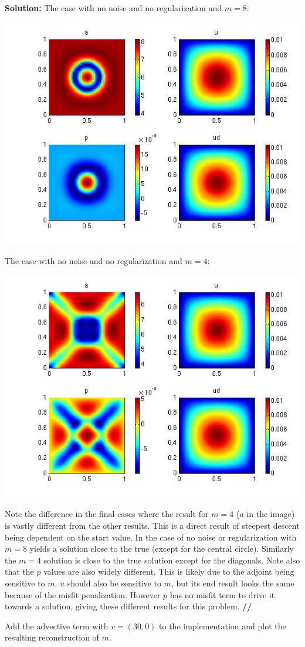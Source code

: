 \documentclass[11pt]{article}
\newenvironment{solution}{\begin{trivlist}\item[]{\bf Solution:}}
                      {\textbf{//} \end{trivlist}}
\begin{document}
\begin{enumerate}
\begin{solution}
The case with no noise and no regularization and $m = 8$:
\begin{center}
\includegraphics[width = 6 cm]{figs/prob2aNoNoiseNoRegM8.jpg}
\end{center}

The case with no noise and no regularization and $m = 4$:
\begin{center}
\includegraphics[width = 6 cm]{figs/prob2aNoNoiseNoRegM4.jpg}
\end{center}

Note the difference in the final cases where the result for $m = 4$ ($a$
 in the image) is vastly different from the other results. This is a
 direct result of steepest descent being dependent on the start
 value. In the case of no noise or regularization with $m = 8$ yields a
 solution close to the true (except for the central circle). Similarly
 the $m = 4$ solution is close to the true solution except for the
 diagonals. Note also that the $p$ values are also widely
 different. This is likely due to the adjoint being sensitive to
 $m$. $u$ should also be sensitive to $m$, but its end result looks the
 same because of the misfit penalization. However $p$ has no misfit term
 to drive it towards a solution, giving these different results for this
 problem. 
\end{solution}

\item[(b)]Add the advective term with $v = (30, 0)$ to the implementation and plot the
resulting reconstruction of $m$.


\end{enumerate}
\end{document}
